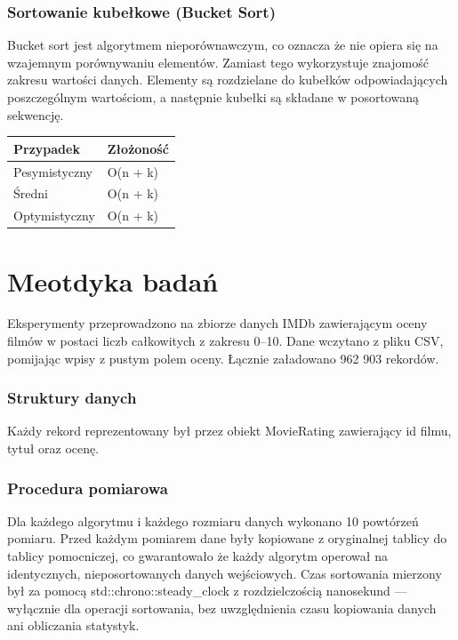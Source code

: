 \documentclass[12pt,a4paper,twocolumn]{article}
\begin{document}
\subsubsection*{Sortowanie kubełkowe (Bucket Sort)}
Bucket sort jest algorytmem nieporównawczym, co oznacza że nie opiera się 
na wzajemnym porównywaniu elementów. Zamiast tego wykorzystuje znajomość zakresu 
wartości danych. Elementy są rozdzielane do kubełków odpowiadających poszczególnym wartościom, 
a następnie kubełki są składane w posortowaną sekwencję.

\begin{table}[H]
\centering
\begin{tabular}{ll}
Przypadek     & Złożoność  \\ \hline
Pesymistyczny & O(n + k) \\ \hline
Średni        & O(n + k) \\ \hline
Optymistyczny & O(n + k) \\ \hline
\end{tabular}
\end{table}

\section{Meotdyka badań}
Eksperymenty przeprowadzono na zbiorze danych IMDb 
zawierającym oceny filmów w postaci liczb całkowitych z 
zakresu 0–10. Dane wczytano z pliku CSV, pomijając wpisy z pustym
polem oceny. Łącznie załadowano 962 903 rekordów.

\subsubsection*{Struktury danych}
Każdy rekord reprezentowany był przez obiekt
MovieRating zawierający id filmu, tytuł 
oraz ocenę.

\subsubsection*{Procedura pomiarowa}
Dla każdego algorytmu i każdego rozmiaru danych wykonano 
10 powtórzeń pomiaru. Przed każdym pomiarem dane były 
kopiowane z oryginalnej tablicy do tablicy pomocniczej, co 
gwarantowało że każdy algorytm operował na identycznych, 
nieposortowanych danych wejściowych.
Czas sortowania mierzony był za pomocą std::chrono::steady\_clock z 
rozdzielczością nanosekund — wyłącznie dla operacji sortowania, 
bez uwzględnienia czasu kopiowania danych ani obliczania statystyk.
\end{document}
